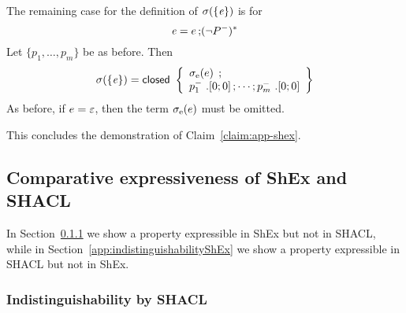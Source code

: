 The remaining case for the definition of $\sigma(\left\{ \mathit{e} \right\})$ is for
\[
\mathit{e} = e \mathop{;} (\neg{P^{-}})^{*}
\]
Let $\{p_1, \dots, p_m\}$ be as before.
Then
\[
  \sigma(\left\{ \mathit{e} \right\})
=
  \mathsf{closed} \
  \left\{
  \begin{array}{l}
    \sigma_{\text{e}}(e) \;\mathop{;} \\
    p_1^{-}\ .[0;0] \mathop{;} \cdots \mathop{;} p_m^{-}\
    .[0;0]
  \end{array}
  \right\}
\]
As before, if $e = \varepsilon$, then the term $\sigma_{\text{e}}(e)$ must be
omitted.

This concludes the demonstration of Claim~\ref{claim:app-shex}.

\subsection{Comparative expressiveness of ShEx and SHACL}

In Section~\ref{app:indistinguishabilitySHACL} we show a property expressible in ShEx but not in SHACL, while in Section~\ref{app:indistinguishabilityShEx} we show a property expressible in SHACL but not in ShEx.


\subsubsection{Indistinguishability by SHACL}
\label{app:indistinguishabilitySHACL}


